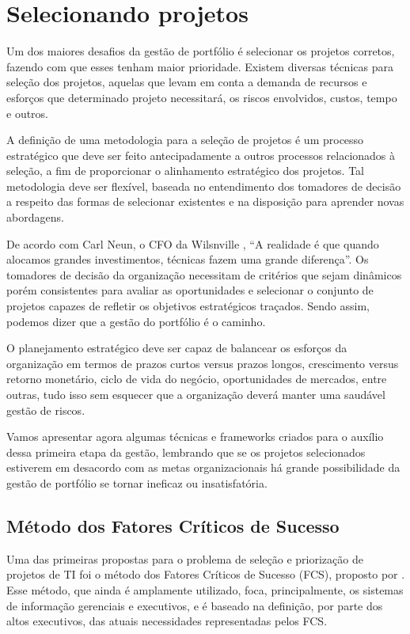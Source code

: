 \documentclass[12pt,a4paper,ruledheader,tocpage=prefix,floatnumber=continuous,pagestart=folhaderosto,font=times]{abnt}
\begin{document}
\section{Selecionando projetos}
Um dos maiores desafios da gestão de portfólio é selecionar os projetos corretos, fazendo com que esses tenham maior prioridade. Existem diversas 
técnicas para seleção dos projetos, aquelas que levam em conta a demanda de recursos e esforços que determinado projeto necessitará, os riscos envolvidos,
custos, tempo e outros. 

A definição de uma metodologia para a seleção de projetos é um processo estratégico que deve ser feito antecipadamente a outros processos relacionados à 
seleção, a fim de proporcionar o alinhamento estratégico dos projetos. Tal metodologia deve ser flexível, baseada no entendimento dos tomadores de 
decisão a respeito das formas de selecionar existentes e na disposição para aprender novas abordagens\cite{archer}.

De acordo com Carl Neun, o CFO da Wilsnville \cite{johnson}, “A realidade é que quando alocamos grandes investimentos, técnicas fazem uma grande 
diferença”. Os tomadores de decisão da organização necessitam de critérios que sejam dinâmicos porém consistentes para avaliar as oportunidades e selecionar
o conjunto de projetos capazes de refletir os objetivos estratégicos traçados. Sendo assim, podemos dizer que a gestão do portfólio é o caminho.

O planejamento estratégico deve ser capaz de balancear os esforços da organização em termos de prazos curtos versus prazos longos, crescimento versus retorno
monetário, ciclo de vida do negócio, oportunidades de mercados, entre outras, tudo isso sem esquecer que a organização deverá manter uma saudável gestão
de riscos.

Vamos apresentar agora algumas técnicas e frameworks criados para o auxílio dessa primeira etapa da gestão, lembrando que se os projetos selecionados 
estiverem em desacordo com as metas organizacionais há grande possibilidade da gestão de portfólio se tornar ineficaz ou insatisfatória.

\subsection{Método dos Fatores Críticos de Sucesso}
Uma das primeiras propostas para o problema de seleção e priorização de projetos de TI foi o método dos Fatores Críticos de Sucesso (FCS),
proposto por \cite{rockart} . Esse método, que ainda é amplamente utilizado, foca, principalmente, os sistemas de informação gerenciais
e executivos, e é baseado na definição, por parte dos altos executivos, das atuais necessidades representadas pelos FCS.
\end{document}

